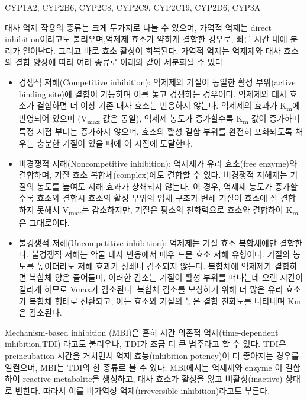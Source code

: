 \documentclass[
  11pt,
  krantz2, a4paper, twoside]{krantz}
\begin{document}
CYP1A2, CYP2B6, CYP2C8, CYP2C9, CYP2C19, CYP2D6, CYP3A

대사 억제 작용의 종류는 크게 두가지로 나눌 수 있으며, 가역적 억제는 direct inhibition이라고도 불리우며,억제제-효소가
약하게 결합한 경우로, 빠른 시간 내에 분리가 일어난다. 그리고 바로 효소 활성이 회복된다.
가역적 억제는 억제제와 대사 효소의 결합 양상에 따라 여러 종류로 아래와 같이 세분화될 수 있다:

\begin{itemize}
\item
  경쟁적 저해(Competitive inhibition): 억제제와 기질이 동일한 활성 부위(active
  binding site)에 결합이 가능하며 이를 놓고 경쟁하는 경우이다. 억제제와 대사 효소가 결합하면
  더 이상 기존 대사 효소는 반응하지 않는다. 억제제의
  효과가 K\textsubscript{m}에 반영되어 있으며 (V\textsubscript{max} 값은 동일), 억제제 농도가
  증가할수록 K\textsubscript{m} 값이 증가하며 특정 시점 부터는 증가하지 않으며, 효소의 활성 결합 부위를 완전히 포화되도록 채우는 충분한 기질이 있을 때에 이 시점에 도달한다.
\item
  비경쟁적 저해(Noncompetitive inhibition): 억제제가 유리 효소(free enzyme)와 결합하며,
  기질-효소 복합체(complex)에도 결합할 수 있다. 비경쟁적 저해제는 기질의 농도를 높여도 저해 효과가 상쇄되지 않는다. 이 경우, 억제제
  농도가 증가할수록 효소와 결합시 효소의 활성 부위의 입체 구조가 변해 기질이 효소에 잘 결합하지 못해서 V\textsubscript{max}는 감소하지만,
  기질은 평소의 친화력으로 효소와 결합하여 K\textsubscript{m} 은 그대로이다.
\item
  불경쟁적 저해(Uncompetitive inhibition): 억제제는 기질-효소 복합체에만 결합한다.
  불경쟁적 저해는 약물 대사 반응에서 매우 드문 효소 저해 유형이다.
  기질의 농도를 높이더라도 저해 효과가 상쇄나 감소되지 않는다. 복합체에 억제제가 결합하면 복합체 양은 줄어들며, 이러한 감소는 기질이 활성 부위를 떠나는데 오랜 시간이 걸리게 하므로 Vmax가 감소된다. 복합체 감소를 보상하기 위해 더 많은 유리 효소가 복합체 형태로 전환되고, 이는 효소와 기질의 높은 결합 친화도를 나타내며 Km은 감소된다.
\end{itemize}

Mechanism-based inhibition (MBI)은 흔히 시간 의존적 억제(time-dependent inhibition,TDI)
라고도 불리우나, TDI가 조금 더 큰 범주라고 할 수 있다. TDI은
preincubation 시간을 거치면서 억제 효능(inhibition potency)이 더 좋아지는 경우를
일컬으며, MBI는 TDI의 한 종류로 볼 수 있다. MBI에서는 억제제와
enzyme 이 결합하여 reactive metabolite을 생성하고, 대사 효소가 활성을 잃고
비활성(inactive) 상태로 변한다. 따라서 이를 비가역성 억제(irreversible
inhibition)라고도 부른다.
\end{document}
